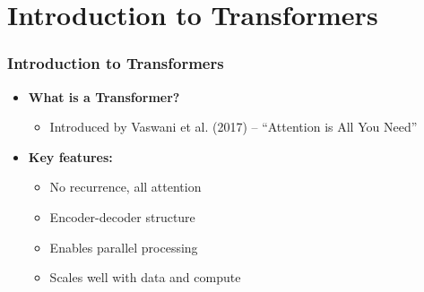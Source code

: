 \section{Introduction to Transformers}
\begin{frame}
\frametitle{Introduction to Transformers}
\begin{itemize}
    \item \textbf{What is a Transformer?}
    \begin{itemize}
        \item Introduced by Vaswani et al. (2017) -- ``Attention is All You Need''
    \end{itemize}
    \item \textbf{Key features:}
    \begin{itemize}
        \item No recurrence, all attention
        \item Encoder-decoder structure
        \item Enables parallel processing
        \item Scales well with data and compute
    \end{itemize}
\end{itemize}
\end{frame}
